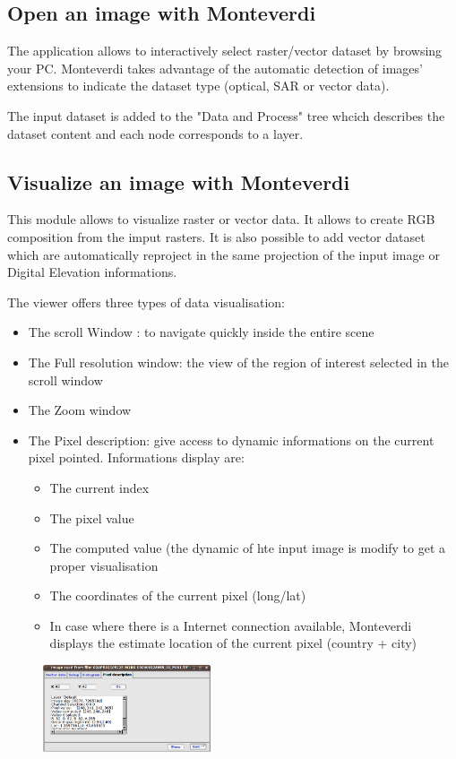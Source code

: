 \subsection{Open an image with Monteverdi}
The application allows to interactively select raster/vector dataset by browsing your PC. Monteverdi takes
advantage of the automatic detection of images' extensions to indicate the dataset type (optical, SAR or vector data).   

The input dataset is added to the "Data and Process" tree whcich describes the dataset content and each node corresponds to a layer.

\subsection{Visualize an image with Monteverdi}
This module allows to visualize raster or vector data. It allows to create RGB composition from the imput rasters. It is also possible to add 
vector dataset which are automatically reproject in the same projection of the input image or Digital Elevation informations. 

The viewer offers three types of data visualisation: 

\begin{itemize}
\item The scroll Window : to navigate quickly inside the entire scene
\item The Full resolution window: the view of the region of interest selected in the scroll window 
\item The Zoom window
\item The Pixel description: give access to dynamic informations on the current pixel pointed. Informations display are:
  \begin{itemize}
  \item The current index
  \item The pixel value 
  \item The computed value (the dynamic of hte input image is modify to get a proper visualisation
  \item The coordinates of the current pixel (long/lat)
  \item In case where there is a Internet connection available, Monteverdi displays the estimate location of the current pixel (country + city)  
  \end{itemize} 
\end{itemize}

\begin{figure}
   \center
   \includegraphics[width=0.44\textwidth]{../Art/MonteverdiImages/monteverdi_viewer_pixel_description.png}
   \label{fig:viewerpixeldescription}
\end{figure}

